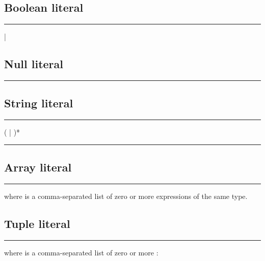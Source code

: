 \subsection{Boolean literal}

\begin{grammar}
\rule{boolean-literal}  | 
\end{grammar}

\subsection{Null literal}

\begin{grammar}
\rule{null-literal} 
\end{grammar}

\subsection{String literal}

\begin{grammar}
\rule{string-literal} ( | )*\\
\rule{interpolated-expression} \code{\$\{}  \code{\}}
\end{grammar}

\subsection{Array literal}

\begin{grammar}
\rule{array-literal} \code{[}  \code{]}
\end{grammar}

where  is a comma-separated list of zero or more expressions of the
same type.

\subsection{Tuple literal}

\begin{grammar}
\rule{tuple-literal} \code{(}  \code{)}
\end{grammar}

where  is a comma-separated list of zero or more
:

